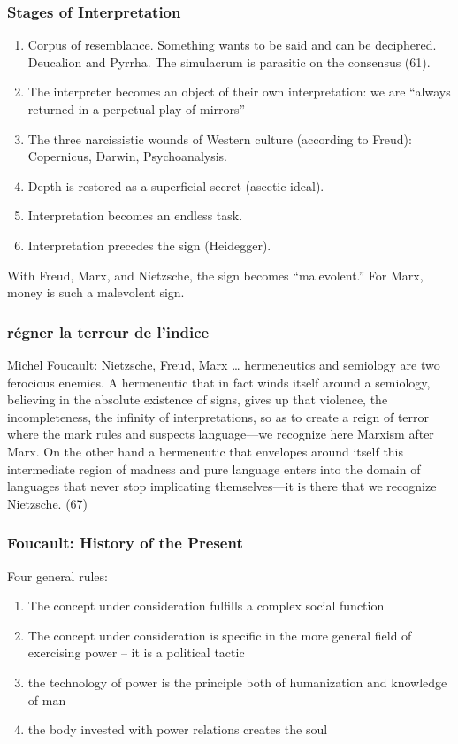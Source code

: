 \documentclass[xcolor=dvipsnames]{beamer}
\begin{document}
\begin{frame}
  \frametitle{Stages of Interpretation}
  \begin{enumerate}
  \item Corpus of resemblance. Something wants to be said and can be
    deciphered. Deucalion and Pyrrha. The simulacrum is parasitic on
    the consensus (61).
  \item The interpreter becomes an object of their own interpretation:
    we are ``always returned in a perpetual play of mirrors''
  \item The three narcissistic wounds of Western culture (according to
    Freud): Copernicus, Darwin, Psychoanalysis.
  \item Depth is restored as a superficial secret (ascetic ideal).
  \item Interpretation becomes an endless task.
  \item Interpretation precedes the sign (Heidegger).
  \end{enumerate}
  With Freud, Marx, and Nietzsche, the sign becomes ``malevolent.''
  For Marx, money is such a malevolent sign.
\end{frame}

\begin{frame}
  \frametitle{r{\'e}gner la terreur de l'indice}
  \begin{block}{Michel Foucault: Nietzsche, Freud, Marx}
    {\ldots} hermeneutics and semiology are two ferocious enemies. A
    hermeneutic that in fact winds itself around a semiology,
    believing in the absolute existence of signs, gives up that
    violence, the incompleteness, the infinity of interpretations, so
    as to create a reign of terror where the mark rules and suspects
    language---we recognize here Marxism after Marx. On the other hand
    a hermeneutic that envelopes around itself this intermediate
    region of madness and pure language enters into the domain of
    languages that never stop implicating themselves---it is there
    that we recognize Nietzsche. (67)
  \end{block}
\end{frame}

\begin{frame}
  \frametitle{Foucault: History of the Present}
Four general rules:
\begin{enumerate}
\item The concept under consideration fulfills a \alert{complex
    social function}
\item The concept under consideration is specific in the more
  general field of exercising power -- it is a \alert{political
    tactic}
\item the \alert{technology of power} is the principle both of
  humanization and knowledge of man
\item the body invested with power relations \alert{creates the soul}
\end{enumerate}
\end{frame}
\end{document}
